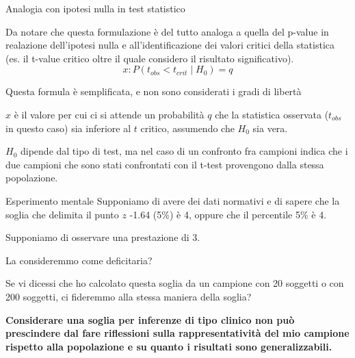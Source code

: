 \documentclass[
  ignorenonframetext,
]{beamer}
\begin{document}
\begin{frame}{Analogia con ipotesi nulla in test statistico}
\label{analogia-con-ipotesi-nulla-in-test-statistico}
\small

Da notare che questa formulazione è del tutto analoga a quella del
p-value in realazione dell'ipotesi nulla e all'identificazione dei
valori critici della statistica (es. il t-value critico oltre il quale
considero il risultato significativo). \[
x : P (t_{obs}<t_{crit}∣H_0)=q
\]

\begin{center}
\begin{footnotesize}
Questa formula è semplificata, e non sono considerati i gradi di libertà
\end{footnotesize}
\end{center}

\(x\) è il valore per cui ci si attende un probabilità \(q\) che la
statistica osservata (\(t_{obs}\) in questo caso) sia inferiore al \(t\)
critico, assumendo che \(H_0\) sia vera.

\(H_0\) dipende dal tipo di test, ma nel caso di un confronto fra
campioni indica che i due campioni che sono stati confrontati con il
t-test provengono dalla stessa popolazione.
\end{frame}

\begin{frame}{Esperimento mentale}
\label{esperimento-mentale}
Supponiamo di avere dei dati normativi e di sapere che la soglia che
delimita il punto \(z\) -1.64 (5\%) è 4, oppure che il percentile 5\% è
4.

Supponiamo di osservare una prestazione di 3.

La consideremmo come deficitaria?

Se vi dicessi che ho calcolato questa soglia da un campione con 20
soggetti o con 200 soggetti, ci fideremmo alla stessa maniera della
soglia?

\textbf{Considerare una soglia per inferenze di tipo clinico non può
prescindere dal fare riflessioni sulla rappresentatività del mio
campione rispetto alla popolazione e su quanto i risultati sono
generalizzabili.}
\end{frame}
\end{document}
